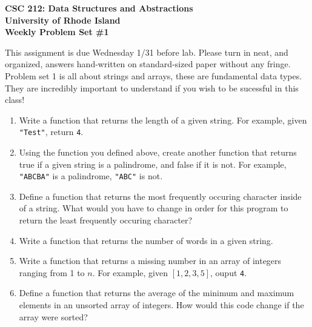 \documentclass[11pt]{article}
\begin{document}
\thispagestyle{empty}

\begin{center}
    {\Large\bf CSC 212: Data Structures and Abstractions}\\
    \medskip
    {\Large\bf University of Rhode Island}\\
    \bigskip
    {\Large\bf Weekly Problem Set \#1}
\end{center}

\vspace{25pt}

This assignment is due Wednesday 1/31 before lab. Please turn in neat, and organized, answers hand-written on standard-sized paper without any fringe.  Problem set 1 is all about strings and arrays, these are fundamental data types. They are incredibly important to understand if you wish to be sucessful in this class! 

\begin{enumerate}[leftmargin=*]

\item Write a function that returns the length of a given string. For example, given \verb|"Test"|, return \verb|4|.

\item Using the function you defined above, create another function that returns true if a given string is a palindrome, and false if it is not. For example, \verb|"ABCBA"| is a palindrome, \verb|"ABC"| is not.

\item Define a function that returns the most frequently occuring character inside of a string. What would you have to change in order for this program to return the least frequently occuring character? 

\item Write a function that returns the number of words in a given string.


\item Write a function that returns a missing number in an array of integers ranging from 1 to $n$. For example, given $[1, 2, 3, 5]$, ouput \verb|4|. 

\item Define a function that returns the average of the minimum and maximum elements in an unsorted array of integers. How would this code change if the array were sorted?

\end{enumerate}
\end{document}
